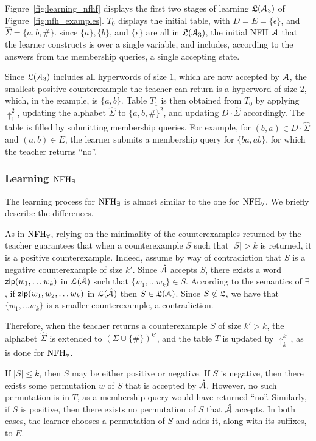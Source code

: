 \begin{example}
Figure~\ref{fig:learning_nfhf} displays the first two stages of learning $\mathfrak{L}(\mathcal{A}_3)$ of Figure~\ref{fig:nfh_examples}.
$T_0$ displays the initial table, with $D=E = \{\epsilon\}$, and $\hat\Sigma = \{a,b,\#\}$. since $\{a\}, \{b\}$, and $\{\epsilon\}$ are all in $\mathfrak{L}(\mathcal{A}_3)$, the initial NFH $\mathcal{A}$ that the learner constructs is over a single variable, and includes, according to the answers from the membership queries, a single accepting state.

Since $\mathfrak{L}(\mathcal{A}_3)$ includes all hyperwords of size $1$, which are now accepted by $\mathcal{A}$, the smallest positive counterexample the teacher can return is a hyperword of size $2$, which, in the example, is $\{a,b\}$. Table $T_1$ is then obtained from $T_0$ by applying $\uparrow_1^2$, updating the alphabet $\hat\Sigma$ to $\{a,b,\#\}^2$, and updating $D\cdot\hat\Sigma$ accordingly. The table is filled by submitting membership queries. For example, for $(b,a)\in D\cdot\hat\Sigma$ and $(a,b)\in E$, the learner submits a membership query for $\{ba, ab\}$, for which the teacher returns ``no''.
\end{example}

\subsubsection{Learning $\textrm{NFH}_{\exists}$}

The learning process for $\textrm{NFH}_{\exists}$ is almost similar to the one for $\textrm{NFH}_{\forall}$. We briefly describe the differences. 


As in $\textrm{NFH}_{\forall}$, relying on the minimality of the counterexamples returned by the teacher guarantees that when a counterexample $S$ such that $|S|>k$ is returned, it is a positive counterexample. 
Indeed, assume by way of contradiction that $S$ is a negative counterexample of size $k'$. Since $\hat{\mathcal{A}}$ accepts $S$, there exists a word $\mathsf{zip}(w_1,\ldots w_k)$ in $\mathcal{L}(\hat{\mathcal{A}})$ such that $\{w_1,\ldots w_k\}\in S$. According to the semantics of $\exists$, if $\mathsf{zip}(w_1,w_2,\ldots w_k)$ in $\mathcal{L}(\hat{\mathcal{A}})$ then $S\in\mathfrak{L}(\mathcal{A})$. Since $S\notin\mathfrak{L}$, we have that $\{w_1,\ldots w_k\}$ is a smaller counterexample, a contradiction. 

Therefore, when the teacher returns a counterexample $S$ of size $k'>k$, the alphabet $\hat\Sigma$ is extended to $(\Sigma\cup\{\#\})^{k'}$, and the table $T$ is updated by $\uparrow_{k}^{k'}$, as is done for $\textrm{NFH}_{\forall}$.

If $|S|\leq k$, then $S$ may be either positive or negative. If $S$ is negative, then there exists some permutation $w$ of $S$ that is accepted by $\hat{\mathcal{A}}$. However, no such permutation is in $T$, as a membership query would have returned ``no''. Similarly, if $S$ is positive, then there exists no permutation of $S$ that $\hat{\mathcal{A}}$ accepts. In both cases, the learner chooses a permutation of $S$ and adds it, along with its suffixes, to $E$. 

